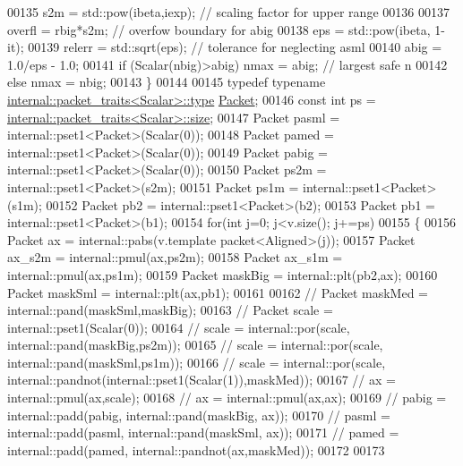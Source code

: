 \begin{DoxyCode}
00135     s2m   = std::pow(ibeta,iexp);   \textcolor{comment}{// scaling factor for upper range}
00136 
00137     overfl  = rbig*s2m;          \textcolor{comment}{// overfow boundary for abig}
00138     eps     = std::pow(ibeta, 1-it);
00139     relerr  = std::sqrt(eps);      \textcolor{comment}{// tolerance for neglecting asml}
00140     abig    = 1.0/eps - 1.0;
00141     \textcolor{keywordflow}{if} (Scalar(nbig)>abig)  nmax = abig;  \textcolor{comment}{// largest safe n}
00142     \textcolor{keywordflow}{else}                    nmax = nbig;
00143   \}
00144 
00145   \textcolor{keyword}{typedef} \textcolor{keyword}{typename} \hyperlink{group___sparse_core___module}{internal::packet\_traits<Scalar>::type} 
      \hyperlink{union_eigen_1_1internal_1_1_packet}{Packet};
00146   \textcolor{keyword}{const} \textcolor{keywordtype}{int} ps = \hyperlink{struct_eigen_1_1internal_1_1packet__traits}{internal::packet\_traits<Scalar>::size};
00147   Packet pasml = internal::pset1<Packet>(Scalar(0));
00148   Packet pamed = internal::pset1<Packet>(Scalar(0));
00149   Packet pabig = internal::pset1<Packet>(Scalar(0));
00150   Packet ps2m = internal::pset1<Packet>(s2m);
00151   Packet ps1m = internal::pset1<Packet>(s1m);
00152   Packet pb2  = internal::pset1<Packet>(b2);
00153   Packet pb1  = internal::pset1<Packet>(b1);
00154   \textcolor{keywordflow}{for}(\textcolor{keywordtype}{int} j=0; j<v.size(); j+=ps)
00155   \{
00156     Packet ax = internal::pabs(v.template packet<Aligned>(j));
00157     Packet ax\_s2m = internal::pmul(ax,ps2m);
00158     Packet ax\_s1m = internal::pmul(ax,ps1m);
00159     Packet maskBig = internal::plt(pb2,ax);
00160     Packet maskSml = internal::plt(ax,pb1);
00161 
00162 \textcolor{comment}{//     Packet maskMed = internal::pand(maskSml,maskBig);}
00163 \textcolor{comment}{//     Packet scale = internal::pset1(Scalar(0));}
00164 \textcolor{comment}{//     scale = internal::por(scale, internal::pand(maskBig,ps2m));}
00165 \textcolor{comment}{//     scale = internal::por(scale, internal::pand(maskSml,ps1m));}
00166 \textcolor{comment}{//     scale = internal::por(scale, internal::pandnot(internal::pset1(Scalar(1)),maskMed));}
00167 \textcolor{comment}{//     ax = internal::pmul(ax,scale);}
00168 \textcolor{comment}{//     ax = internal::pmul(ax,ax);}
00169 \textcolor{comment}{//     pabig = internal::padd(pabig, internal::pand(maskBig, ax));}
00170 \textcolor{comment}{//     pasml = internal::padd(pasml, internal::pand(maskSml, ax));}
00171 \textcolor{comment}{//     pamed = internal::padd(pamed, internal::pandnot(ax,maskMed));}
00172 
00173 

\end{DoxyCode}
